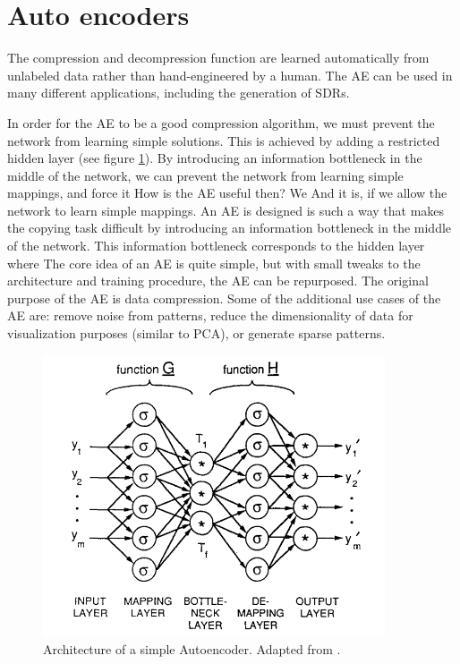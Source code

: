 \section{Auto encoders}

The compression and decompression function are learned automatically from unlabeled data rather than hand-engineered by a human. The AE can be used in many different applications, including the generation of SDRs. 

In order for the AE to be a good compression algorithm, we must prevent the network from learning simple solutions. This is achieved by adding a restricted hidden layer (see figure \ref{fig:AE}). By introducing an information bottleneck in the middle of the network, we can prevent the network from learning simple mappings, and force it 
How is the AE useful then? We  And it is, if we allow the network to learn simple mappings. An AE is designed is such a way that makes the copying task difficult by introducing an information bottleneck in the middle of the network. This information bottleneck corresponds to the hidden layer where 
The core idea of an AE is quite simple, but with small tweaks to the architecture and training procedure, the AE can be repurposed. The original purpose of the AE is data compression. Some of the additional use cases of the AE are: remove noise from patterns, reduce the dimensionality of data for visualization purposes (similar to PCA), or generate sparse patterns.

\begin{figure}[h]
    \centering
    \includegraphics[width=0.9\textwidth]{img/AE.PNG}
    \caption{Architecture of a simple Autoencoder. Adapted from \cite{kramer1991nonlinear}.}
\label{fig:AE}
\end{figure}

